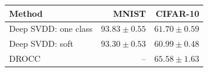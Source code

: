 \begin{tabular}{@{}lrr@{}}
\toprule
\textbf{Method} & \textbf{MNIST} & \textbf{CIFAR-10}\\
\midrule
Deep SVDD: one class & $93.83\pm0.55$ & $61.70\pm0.59$\\
Deep SVDD: soft & $93.30\pm0.53$ & $60.99\pm0.48$\\
DROCC & -- & $65.58\pm1.63$\\
\bottomrule
\end{tabular}
